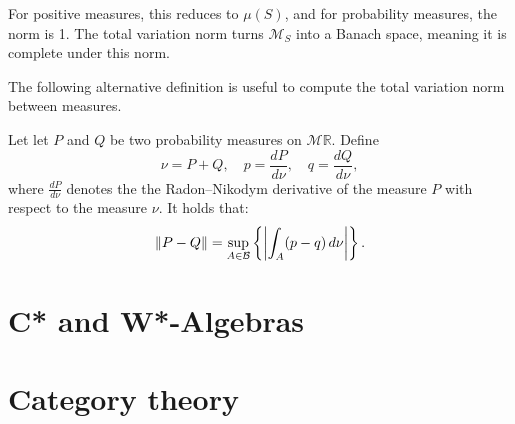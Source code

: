 For positive measures, this reduces to \( \mu(S) \), and for probability measures, the norm is 1. The total variation norm turns \( \mathcal{M}_S \) into a Banach space, meaning it is complete under this norm. 

The following alternative definition is useful to compute the total variation norm between measures.

  \begin{definition} \cite{tsybakov2008}
    Let  let $P$ and $Q$ be two probability measures on $\mathcal{M}\mathbb{R}$. Define
    $$
      \nu = P + Q, \quad p = \frac{dP}{d\nu}, \quad q = \frac{dQ}{d\nu},
    $$
    where $\frac{dP}{d\nu}$ denotes the  the Radon–Nikodym derivative of the measure $P$ with respect to the measure $\nu$. It holds that:
    \begin{align*}
      \left\lVert P-Q \right\rVert = \sup_{A \in  \mathcal{B}} \left\{ \left\vert \int_{A} (p - q) \, d\nu \right\vert \right\}.
    \end{align*}

  \end{definition}

  
  


   











\section{C* and W*-Algebras} \label{sec:c*_w*}


\section{Category theory} \label{sec:catgories}

